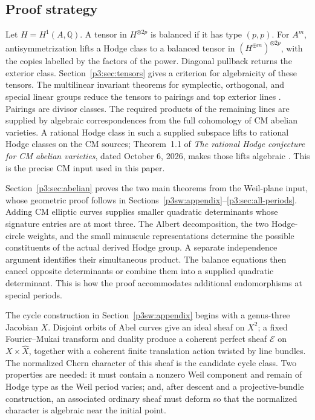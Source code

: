 \documentclass[11pt]{article}
\newcommand{\Q}{\mathbb Q}
\numberwithin{equation}{section}
\begin{document}
\subsection{Proof strategy}

Let \(H=H^1(A,\Q)\). A tensor in \(H^{\otimes 2p}\) is balanced if it
has type \((p,p)\). For \(A^m\), antisymmetrization lifts a Hodge class to
a balanced tensor in \((H^{\oplus m})^{\otimes 2p}\), with the copies
labelled by the factors of the power. Diagonal pullback returns the exterior
class. Section~\ref{p3:sec:tensors} gives a
criterion for algebraicity of these tensors. The multilinear invariant
theorems for symplectic, orthogonal, and special linear groups reduce the
tensors to pairings and top exterior lines
\cite{LehrerZhang2015,LehrerZhang2017,Schrijver2008}. Pairings are divisor
classes. The required products of the remaining lines are supplied by algebraic correspondences
from the full cohomology of CM abelian varieties. A rational Hodge class in
such a supplied subspace lifts to rational Hodge classes on the CM sources;
Theorem~1.1 of \emph{The rational Hodge conjecture for CM abelian
varieties}, dated October 6, 2026, makes those lifts algebraic
\cite{OpenAICM2026}. This is the precise CM input used in this paper.

Section~\ref{p3:sec:abelian} proves the two main theorems from the
Weil-plane input, whose geometric proof follows in
Sections~\ref{p3sw:appendix}--\ref{p3:sec:all-periods}.
Adding CM elliptic curves supplies smaller quadratic determinants whose
signature entries are at most three. The Albert decomposition, the two
Hodge-circle weights, and the small minuscule representations determine
the possible constituents of the actual derived Hodge group. A separate
independence argument identifies their simultaneous product. The balance
equations then cancel opposite determinants or combine them into a
supplied quadratic determinant. This is how the proof accommodates
additional endomorphisms at special periods.

The cycle construction in Section~\ref{p3sw:appendix} begins with a
genus-three Jacobian \(X\). Disjoint
orbits of Abel curves give an ideal sheaf on \(X^2\); a fixed
Fourier--Mukai transform and duality produce a coherent perfect sheaf
\(\mathcal E\) on \(X\times\widehat X\), together with a coherent finite
translation action twisted by line bundles. The normalized Chern character
of this sheaf is the candidate cycle class. Two properties are needed: it
must contain a nonzero Weil component and remain of Hodge type as the Weil
period varies; and, after descent and a projective-bundle construction, an
associated ordinary sheaf must deform so that the normalized character is
algebraic near the initial point.
\end{document}
